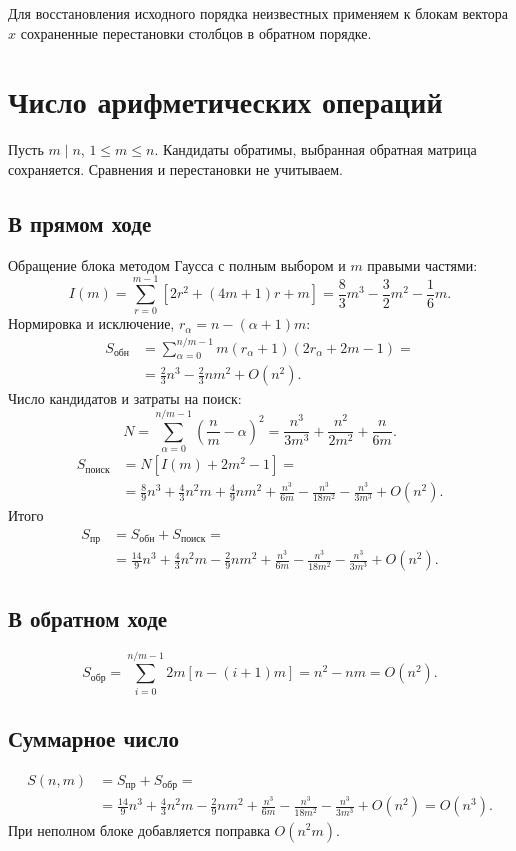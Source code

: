 \documentclass[a4paper,12pt]{article}
\begin{document}
Для восстановления исходного порядка неизвестных применяем к блокам вектора $x$ сохраненные перестановки столбцов в обратном порядке.
\section{Число арифметических операций}
Пусть $m \mid n$, $1 \le m \le n$. Кандидаты обратимы, выбранная обратная матрица сохраняется. Сравнения и перестановки не учитываем.

\subsection{В прямом ходе}
Обращение блока методом Гаусса с полным выбором и $m$ правыми частями:
\[
    I(m) = \sum_{r = 0}^{m - 1}\left[2r^2 + (4m + 1)r + m\right]
    = \frac{8}{3}m^3 - \frac{3}{2}m^2 - \frac{1}{6}m.
\]
Нормировка и исключение, $r_\alpha = n - (\alpha + 1)m$:
\begin{align*}
    S_{\text{обн}}
    & = \sum_{\alpha = 0}^{n/m - 1}m(r_\alpha + 1)(2r_\alpha + 2m - 1) = \\
    & = \frac{2}{3}n^3 - \frac{2}{3}nm^2 + O(n^2).
\end{align*}
Число кандидатов и затраты на поиск:
\[
    N = \sum_{\alpha = 0}^{n/m - 1}\left(\frac{n}{m} - \alpha\right)^2
    = \frac{n^3}{3m^3} + \frac{n^2}{2m^2} + \frac{n}{6m}.
\]
\begin{align*}
    S_{\text{поиск}} & = N\left[I(m) + 2m^2 - 1\right] = \\
    & = \frac{8}{9}n^3 + \frac{4}{3}n^2m + \frac{4}{9}nm^2
    + \frac{n^3}{6m} - \frac{n^3}{18m^2} - \frac{n^3}{3m^3} + O(n^2).
\end{align*}
Итого
\begin{align*}
    S_{\text{пр}} & = S_{\text{обн}} + S_{\text{поиск}} = \\
    & = \frac{14}{9}n^3 + \frac{4}{3}n^2m - \frac{2}{9}nm^2
    + \frac{n^3}{6m} - \frac{n^3}{18m^2} - \frac{n^3}{3m^3} + O(n^2).
\end{align*}

\subsection{В обратном ходе}
\[
    S_{\text{обр}} = \sum_{i = 0}^{n/m - 1}2m[n - (i + 1)m]
    = n^2 - nm = O(n^2).
\]

\subsection{Суммарное число}
\begin{align*}
    S(n,m) & = S_{\text{пр}} + S_{\text{обр}} = \\
    & = \frac{14}{9}n^3 + \frac{4}{3}n^2m - \frac{2}{9}nm^2
    + \frac{n^3}{6m} - \frac{n^3}{18m^2} - \frac{n^3}{3m^3} + O(n^2)
    = O(n^3).
\end{align*}
При неполном блоке добавляется поправка $O(n^2m)$.
\end{document}
